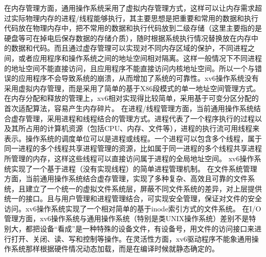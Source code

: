 \documentclass[a4paper,12pt]{report}
\begin{document}
	在内存管理方面，通用操作系统采用了虚拟内存管理方式，这样可以让内存需求超过实际物理内存的进程/线程能够执行，其主要思想是把重要和常用的数据和执行代码放在物理内存中，把不常用的数据和执行代码放到二级存储（这里主要指的是硬盘等可在掉电后保存数据的存储介质），随时根据系统执行情况替换放在内存中的数据和代码。而且通过虚存管理可以实现对不同内存区域的保护，不同进程之间，或者应用程序和操作系统之间的地址空间相对隔离。这样一般情况下不同进程的地址空间不能直接访问，且应用程序不能直接访问内核地址空间。所以一个与错误的应用程序不会导致系统的崩溃，从而增加了系统的可靠性。xv6操作系统没有采用虚拟内存管理，而是采用了简单的基于X86段模式的单一地址空间管理方式。在内存分配和释放的管理上，xv6相对实现得比较简单，采用基于可变分区分配的首次适配算法，容易产生内存碎片。
    	在进程/线程管理方面，当前通用操作系统结合虚存管理，采用进程和线程结合的管理方式。进程代表了一个程序执行的过程以及其所占用的计算机资源（包括CPU、内存、文件等），进程的执行流可用线程来表示。操作系统的调度单位可以是进程或线程。一个进程可以包含多个线程，属于同一进程的多个线程共享进程管理的资源，比如属于同一进程的多个线程共享进程所管理的内存，这样这些线程可以直接访问属于进程的全局地址空间。 xv6操作系统实现了一个基于进程（没有实现线程）的简单进程管理机制。
    	在文件系统管理方面，当前通用操作系统结合虚存管理，实现了多种复杂、高效且可靠的文件系统，且建立了一个统一的虚拟文件系统层，屏蔽不同文件系统的差异，对上层提供统一的接口。且与用户管理和进程管理结合，可实现安全管理，保证对文件的安全访问。xv6操作系统实现了一个相对简单的基于inode索引方式的文件系统。
   	在I/O管理方面，xv6操作系统与通用操作系统（特别是类UNIX操作系统）差别不是特别大，都把设备“看成”是一种特殊的设备文件，有设备号，用文件的访问接口来进行打开、关闭、读、写和控制等操作。在灵活性方面，xv6驱动程序不能象通用操作系统那样根据硬件情况动态加载，而是在编译时候就静态确定的。
\end{document}
